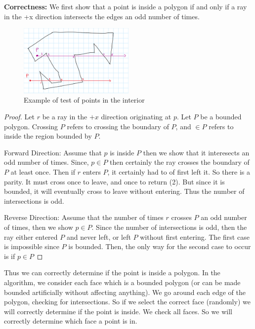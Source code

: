 \documentclass[11pt]{article}
\begin{document}
\textbf{Correctness: } We first show that a point is inside a polygon if and only if a ray in the +x direction 
intersects the edges an odd number of times. 

\begin{figure}[H]
    \centering
    \includegraphics[width = 0.5\textwidth]{interior}
    \caption{Example of test of points in the interior}
    \label{fig:interior}
\end{figure}

\begin{proof}
    
    Let $r$ be a ray in the $+x$ direction originating at $p$. Let $P$ be a bounded polygon. 
    Crossing $P$ refers to crossing the boundary of $P$, and $\in P$ refers to inside the region bounded by $P$.

    Forward Direction: Assume that $p$ is inside $P$ then we show that it interesects an odd number of times.
    Since, $p \in P$ then certainly the ray crosses the boundary of $P$ at least once. Then if $r$ enters $P$,
    it certainly had to of first left it. So there is a parity. It must cross once to leave, and once to return (2).
    But since it is bounded, it will eventually cross to leave without entering. Thus the number of intersections is odd.

    Reverse Direction: Assume that the number of times $r$ crosses $P$ an odd number of times, then we show $p \in P$.
    Since the number of intersections is odd, then the ray either entered $P$ and never left,
    or left $P$ without first entering. The first case is impossible since $P$ is bounded. 
    Then, the only way for the second case to occur is if $p \in P$
\end{proof}

Thus we can correctly determine if the point is inside a polygon. In the algorithm, we consider each face which is a bounded polygon (or can be made bounded artificially without affecting anything).
We go around each edge of the polygon, checking for intersections. So if we select the correct face (randomly) we will correctly
determine if the point is inside. We check all faces. So we will correctly determine which face a point is in.
\end{document}
